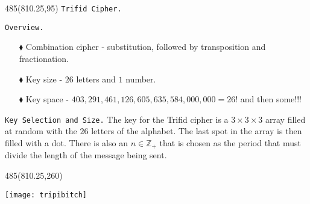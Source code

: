 \documentclass{beamer}%
\begin{document}
\begin{textblock}{485}(810.25,95)
	{\centering \Large\Huge \texttt{Trifid Cipher.}}
	\begin{block}{\texttt{Overview.}}
			\begin{itemize}
				\item [$\blacklozenge$] Combination cipher - substitution, followed by transposition and fractionation.
				\item [$\blacklozenge$] Key size - $26$ letters and $1$ number.
				\item [$\blacklozenge$] Key space - $403,291,461,126,605,635,584,000,000=26!$ and then some$!!!$
			\end{itemize}
	\end{block}
	\begin{block}{\texttt{Key Selection and Size.}}
		The key for the Trifid cipher is a $3\times 3\times 3$ array filled at random with the $26$ letters of the alphabet. The last spot in the array is then filled with a dot. There is also an $n\in\mathbb{Z}_{+}$ that is chosen as the period that must divide the length of the message being sent.
	\end{block}
\end{textblock}
\begin{textblock}{485}(810.25,260)
	\begin{center}
	\texttt{[image: tripibitch]}
	\end{center}
\end{textblock}
\end{document}
